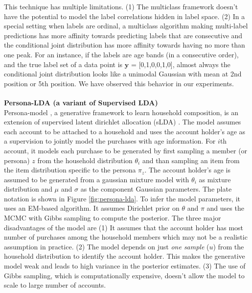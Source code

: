 This technique has multiple limitations. (1) The multiclass framework doesn't have the potential to model the label correlations hidden in label space. (2) In a special setting when labels are ordinal, a multiclass algorithm making multi-label predictions has more affinity towards predicting labels that are consecutive and the conditional joint distribution has more affinity towards having no more than one peak. For an instance, if the labels are age bands (in a consecutive order), and the true label set of a data point is $\textbf{y}$ = [0,1,0,0,1,0], almost always the conditional joint distribution looks like a unimodal Gaussian with mean at 2nd position or 5th position. We have observed this behavior in our experiments.
\\\\
\textbf{Persona-LDA (a variant of Supervised LDA)}\\
Persona-model \cite{pani2016amlc}, a generative framework to learn household composition, is an extension of supervised latent dirichlet allocation (sLDA) \cite{mcauliffe2008supervised}. The model assumes each account to be attached to a household and uses the account holder's age as a supervision to jointly model the purchases with age information.  For $i$th account, it models each purchase to be generated by first sampling a member (or persona) $z$ from the household distribution \textbf{$\theta_i$} and than sampling an item from the item distribution specific to the persona \textbf{$\pi_z$}. The account holder's age is assumed to be generated from a gaussian mixture model with \textbf{$\theta_i$} as mixture distribution and \textbf{$\mu$} and \textbf{$\sigma$} as the component Gaussian parameters. The plate notation is shown in Figure \ref{fig:persona-lda}. To infer the model parameters, it uses an EM-based algorithm. It assumes Dirichlet prior on \textbf{$\theta$} and \textbf{$\pi$} and uses the MCMC with Gibbs sampling to compute the posterior. The three major disadvantages of the model are 
(1) It assumes that the account holder has most number of purchases among the household members which may not be a realistic assumption in practice. 
(2) The model depends on just \textit{one sample} ($u$) from the household distribution to identify the account holder. This makes the generative model weak and leads to high variance in the posterior estimates.  
(3)
The use of Gibbs sampling, which is computationally expensive, doesn't allow the model to scale to large number of accounts. 


